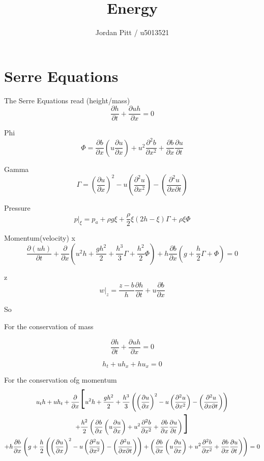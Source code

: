 \documentclass[12pt]{article}
\begin{document}
\title{Energy}
\author{Jordan Pitt / u5013521}

\section{Serre Equations}

The Serre Equations read
(height/mass)
\[\frac{\partial h}{\partial t} + \frac{\partial uh}{\partial x} = 0 \]

Phi
\[\Phi = \frac{\partial b}{\partial x}\left(u \frac{\partial u}{\partial x}\right) + u^2 \frac{\partial^2 b}{\partial x^2} + \frac{\partial b}{\partial x}\frac{\partial u}{\partial t}\]

Gamma
\[\Gamma = \left(\frac{\partial u}{\partial x} \right)^2 - u \left(\frac{\partial^2 u}{\partial x^2} \right) - \left(\frac{\partial^2 u}{\partial x \partial t} \right)\]

Pressure
\[p|_\xi = p_a + \rho g \xi + \frac{\rho}{2}\xi\left(2h - \xi\right)\Gamma + \rho \xi \Phi \]


Momentum(velocity)
x
\[ \frac{\partial (uh)}{\partial t} + \frac{\partial}{\partial x}\left(u^2 h + \frac{gh^2}{2} + \frac{h^3}{3}\Gamma + \frac{h^2}{2} \Phi\right) + h \frac{\partial b}{\partial x}\left(g + \frac{h}{2}\Gamma + \Phi\right) = 0\]

z
\[w|_z = \frac{z - b}{h} \frac{\partial h}{\partial t} + u \frac{\partial b}{\partial x}\]


So

For the conservation of mass

\[\frac{\partial h}{\partial t} + \frac{\partial uh}{\partial x} = 0 \]

\[h_t + uh_x + hu_x = 0 \]

For the conservation ofg momentum
\begin{multline*}
u_th + uh_t + \frac{\partial}{\partial x}\scalebox{3}{[}u^2 h + \frac{gh^2}{2} + \frac{h^3}{3}\left(\left(\frac{\partial u}{\partial x} \right)^2 - u \left(\frac{\partial^2 u}{\partial x^2} \right) - \left(\frac{\partial^2 u}{\partial x \partial t} \right)\right) \\ + \frac{h^2}{2} \left(\frac{\partial b}{\partial x}\left(u \frac{\partial u}{\partial x}\right) + u^2 \frac{\partial^2 b}{\partial x^2} + \frac{\partial b}{\partial x}\frac{\partial u}{\partial t}\right)\scalebox{3}{]}  \\ + h \frac{\partial b}{\partial x}\left(g + \frac{h}{2}\left(\left(\frac{\partial u}{\partial x} \right)^2 - u \left(\frac{\partial^2 u}{\partial x^2} \right) - \left(\frac{\partial^2 u}{\partial x \partial t} \right)\right) + \left(\frac{\partial b}{\partial x}\left(u \frac{\partial u}{\partial x}\right) + u^2 \frac{\partial^2 b}{\partial x^2} + \frac{\partial b}{\partial x}\frac{\partial u}{\partial t}\right)\right) = 0
\end{multline*}
\end{document}
